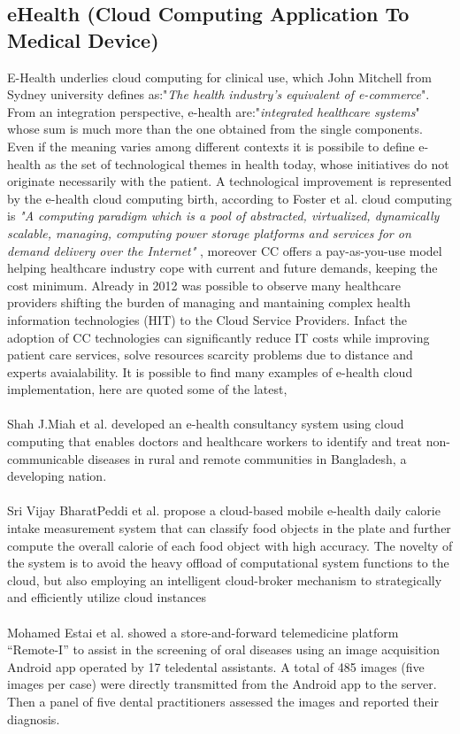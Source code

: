\subsection{eHealth (Cloud Computing Application To Medical Device)}
E-Health underlies cloud computing for clinical use, which John Mitchell from Sydney university defines as:"\textit{The health industry's equivalent of e-commerce}". From an integration perspective, e-health are:"\textit{integrated healthcare systems}" whose sum is much more than the one obtained from the single components. Even if the meaning varies among different contexts \cite{Eysenbach} it is possibile to define e-health as the set of technological themes in health today, whose initiatives do not originate necessarily with the patient. \cite{oh}\cite{DellaMea}
A technological improvement is represented by the e-health cloud computing birth, according to Foster et al. cloud computing is \textit{"A computing paradigm which is a pool of abstracted, virtualized, dynamically scalable, managing, computing power storage platforms and services  for on demand delivery over the Internet"} \cite{foster}, moreover CC offers a pay-as-you-use model helping healthcare industry cope with current and future demands, keeping the cost minimum. \cite{AbuKhousa}
Already in 2012 was possible to observe many healthcare providers shifting the burden of managing and mantaining complex health information technologies (HIT) to the Cloud Service Providers. \cite{foster}
Infact the adoption of CC technologies can significantly reduce IT costs while improving patient care services, solve resources scarcity problems due to distance and experts avaialability. \cite{AbuKhousa}
It is possible to find many examples of e-health cloud implementation, here are quoted some of the latest,\\\\
Shah J.Miah et al. developed an e-health consultancy system using cloud computing that enables doctors and healthcare workers to identify and treat non-communicable diseases in rural and remote communities in Bangladesh, a developing nation. \cite{MIAH2017311}\\\\
Sri Vijay BharatPeddi et al. propose a cloud-based mobile e-health daily calorie intake measurement system that can classify food objects in the plate and further compute the overall calorie of each food object with high accuracy. The novelty of the system is to avoid the  heavy offload of computational system functions to the cloud, but also employing an intelligent cloud-broker mechanism to strategically and efficiently utilize cloud instances \cite{PEDDI201771}\\\\
Mohamed Estai et al. showed a store-and-forward telemedicine platform “Remote-I” to assist in the screening of oral diseases using an image acquisition Android app operated by 17 teledental assistants. A total of 485 images (five images per case) were directly transmitted from the Android app to the server. Then a panel of five dental practitioners assessed the images and reported their diagnosis.\cite{mohamedestai}